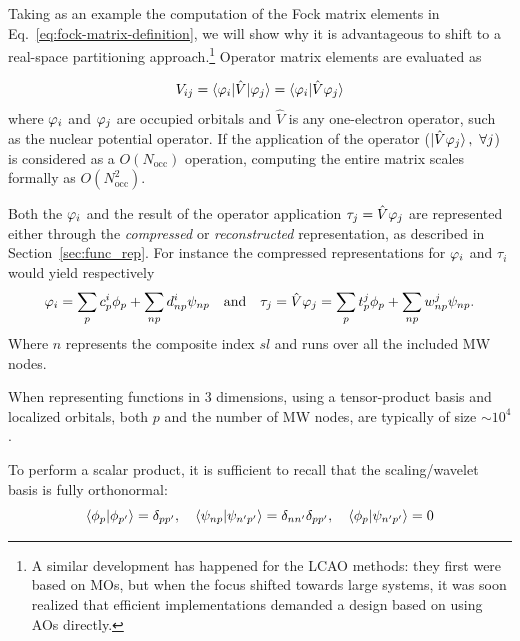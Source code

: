 \documentclass[journal=jctcce, manuscript=article]{achemso}
\begin{document}
Taking as an example the computation of the Fock matrix elements in Eq.~\eqref{eq:fock-matrix-definition},  we will show why it is advantageous to shift to a real-space partitioning approach.\footnote{A similar development has happened for the \ac{LCAO} methods: they first were based on \acp{MO}, but when the focus shifted towards large systems, it was soon realized that efficient implementations demanded a design based on using \acp{AO} directly.\cite{Helgaker2000-yb}}
Operator matrix elements are evaluated as 

\begin{equation}
  V_{ij} = \braket{\varphi_{i} | {\hat V} |\varphi_j}  = \braket{\varphi_i | {\hat V} \varphi_j} 
\end{equation}
where $\varphi_i$ and $\varphi_j$ are occupied orbitals and ${\hat V}$ is any one-electron operator, such as the nuclear potential operator. If the application of the operator ($\ket{{\hat V} \varphi_j},\,\,\forall j$) is considered as a $O(N_{\mathrm{occ}})$
operation, computing the entire matrix scales formally as $O(N_{\mathrm{occ}}^2)$. 

Both the $\varphi_i$
and the result of the operator application $\tau_j = \hat{V} \varphi_j$
are represented either through the \emph{compressed} or \emph{reconstructed} representation, as described in Section~\ref{sec:func_rep}. For instance the compressed representations for $\varphi_i$ and $\tau_i$ would yield respectively
\begin{equation}\label{eq:compressed_orb}
  \varphi_i = \sum_{p} c^i_p \phi_p + \sum_{np} d^i_{np} \psi_{np} \quad\text{and}\quad \tau_j = {\hat V} \varphi_j = \sum_{p} t^j_p \phi_p + \sum_{np} w^j_{np} \psi_{np}.
\end{equation}
Where $n$ represents the composite index $sl$ and runs over all the included \ac{MW} nodes.

When representing functions in 3 dimensions,
using a tensor-product basis and localized orbitals, both $p$ and the number of \ac{MW} nodes, are typically of size $\sim 10^4$. 


To perform a scalar product, it is sufficient to recall that the scaling/wavelet basis is fully orthonormal:
\begin{equation}\label{eq:wavelet_othrogonality}
  \braket{\phi_{p} | \phi_{p'}}  = \delta_{pp'}, \quad   \braket{\psi_{np} | \psi_{n'p'}}  = \delta_{nn'}\delta_{pp'}, \quad   \braket{\phi_{p} | \psi_{n'p'}}  = 0  
\end{equation}
\end{document}
